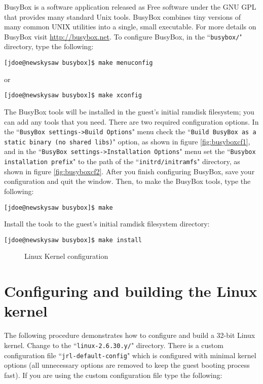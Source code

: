 \documentclass{article}[11pt]
\def\colfigsize{\epsfxsize=5in}
\begin{document}
BusyBox is a software application released as Free software under the GNU GPL
that provides many standard Unix tools. BusyBox combines tiny versions of many
common UNIX utilities into a single, small executable. For more details on
BusyBox visit \url{http://busybox.net}. To configure BusyBox, in the
``\verb+busybox/+" directory, type the following:

\begin{verbatim}
[jdoe@newskysaw busybox]$ make menuconfig
\end{verbatim}

\noindent
or

\begin{verbatim}
[jdoe@newskysaw busybox]$ make xconfig
\end{verbatim}

\noindent
The BusyBox tools will be installed in the guest's initial ramdisk filesystem;
you can add any tools that you need. There are two required configuration
options. In the
``\verb|BusyBox settings->Build Options|" menu check the
``\verb|Build BusyBox as a static binary (no shared libs)|" option, as shown in
figure \ref{fig:busyboxcf1}, and in the
``\verb|BusyBox settings->Installation Options|" menu set the
``\verb|Busybox installation prefix|" to the path of the
``\verb|initrd/initramfs|" directory, as shown in figure \ref{fig:busyboxcf2}.
After you finish configuring BusyBox, save your configuration and quit the
window. Then, to make the BusyBox tools, type the following:

\begin{verbatim}
[jdoe@newskysaw busybox]$ make
\end{verbatim}
Install the tools to the guest's initial ramdisk filesystem directory:
\begin{verbatim}
[jdoe@newskysaw busybox]$ make install
\end{verbatim}

\begin{figure}[ht]
  \begin{center}
    \colfigsize{}
  \end{center}
  \caption{Linux Kernel configuration}
  \label{fig:linuxcf}
\end{figure}


\section{Configuring and building the Linux kernel}

The following procedure demonstrates how to configure and build a 32-bit Linux
kernel. Change to the ``\verb|linux-2.6.30.y/|" directory. There is a custom
configuration file ``\verb|jrl-default-config|" which is configured with minimal
kernel options (all unnecessary options are removed to keep the guest booting
process fast). If you are using the custom configuration file type the
following:
\end{document}
